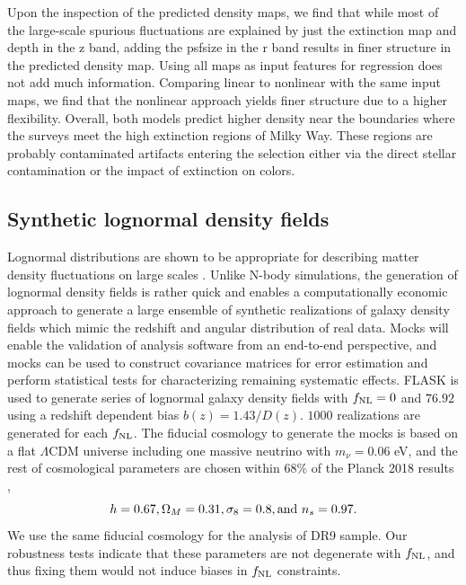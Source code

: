 Upon the inspection of the predicted density maps, we find that while most of the large-scale spurious fluctuations are explained by just the extinction map and depth in the z band, adding the psfsize in the r band results in finer structure in the predicted density map. Using all maps as input features for regression does not add much information. Comparing linear to nonlinear with the same input maps, we find that the nonlinear approach yields finer structure due to a higher flexibility.  Overall, both models predict higher density near the boundaries where the surveys meet the high extinction regions of Milky Way. These regions are probably contaminated artifacts entering the selection either via the direct stellar contamination or the impact of extinction on colors.

\subsection{Synthetic lognormal density fields}\label{ssec:mocks}
Lognormal distributions are shown to be appropriate for describing matter density fluctuations on large scales \citep{coles1991}. Unlike N-body simulations, the generation of lognormal density fields is rather quick and enables a computationally economic approach to generate a large ensemble of synthetic realizations of galaxy density fields which mimic the redshift and angular distribution of real data. Mocks will enable the validation of analysis software from an end-to-end perspective, and mocks can be used to construct covariance matrices for error estimation and perform statistical tests for characterizing remaining systematic effects. \textsc{FLASK}  \citep[Full-sky Lognormal Astro-fields Simulation Kit;][]{Xavier_2016} is used to generate series of lognormal galaxy density fields with $f_{\rm NL}=0$ and $76.92$ using a redshift dependent bias $b(z)=1.43/D(z)$. $1000$ realizations are generated for each $f_{\rm NL}$. The fiducial cosmology to generate the mocks is based on a flat $\Lambda$CDM universe including one massive neutrino with $m_{\nu}=0.06$ eV, and the rest of cosmological parameters are chosen within $68\%$ of the Planck 2018 results \citep{aghanim2020planck},
\begin{equation*}
    h = 0.67,  \Omega_{M}=0.31, \sigma_{8}=0.8, {\rm and}~ n_{s}=0.97.
\end{equation*}
We use the same fiducial cosmology for the analysis of DR9 sample. Our robustness tests indicate that these parameters are not degenerate with $f_{\rm NL}$, and thus fixing them would not induce biases in $f_{\rm NL}$ constraints.